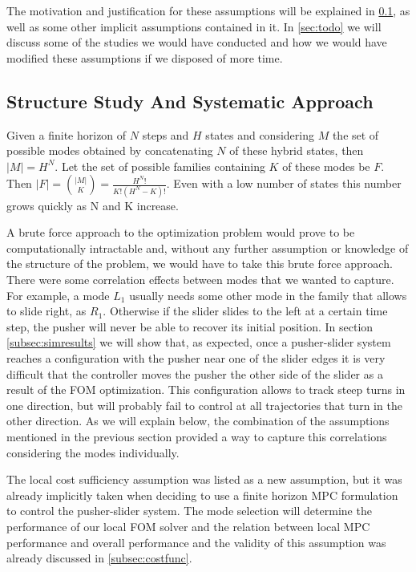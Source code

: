 \documentclass[12,twoside]{TFG-GM}
\theoremstyle{definition}
\theoremstyle{remark}
\begin{document}
The motivation and justification for these assumptions will be explained in \ref{subsec:structure}, as well as some other implicit assumptions contained in it. In \ref{sec:todo} we will discuss some of the studies we would have conducted and how we would have modified these assumptions if we disposed of more time.

\subsection{Structure Study And Systematic Approach}
\label{subsec:structure}
Given a finite horizon of $N$ steps and $H$ states and considering $M$ the set of possible modes obtained by concatenating $N$ of these hybrid states, then $|M| = H^N$. Let the set of possible families containing $K$ of these modes be $F$. Then $|F| = \binom {|M|}{K} = \frac{H^{N}!}{K!(H^N-K)!}$. Even with a low number of states this number grows quickly as N and K increase.

A brute force approach to the optimization problem would prove to be computationally intractable and, without any further assumption or knowledge of the structure of the problem, we would have to take this brute force approach. There were some correlation effects between modes that we wanted to capture. For example, a mode $L_1$ usually needs some other mode in the family that allows to slide right, as $R_1$. Otherwise if the slider slides to the left at a certain time step, the pusher will never be able to recover its initial position. In section \ref{subsec:simresults} we will show that, as expected, once a pusher-slider system reaches a configuration with the pusher near one of the slider edges it is very difficult that the controller moves the pusher the other side of the slider as a result of the FOM optimization. This configuration allows to track steep turns in one direction, but will probably fail to control at all trajectories that turn in the other direction. As we will explain below, the combination of the assumptions mentioned in the previous section provided a way to capture this correlations considering the modes individually.

The local cost sufficiency assumption was listed as a new assumption, but it was already implicitly taken when deciding to use a finite horizon MPC formulation to control the pusher-slider system. The mode selection will determine the performance of our local FOM solver and the relation between local MPC performance and overall performance and the validity of this assumption was already discussed in \ref{subsec:costfunc}.
\end{document}
